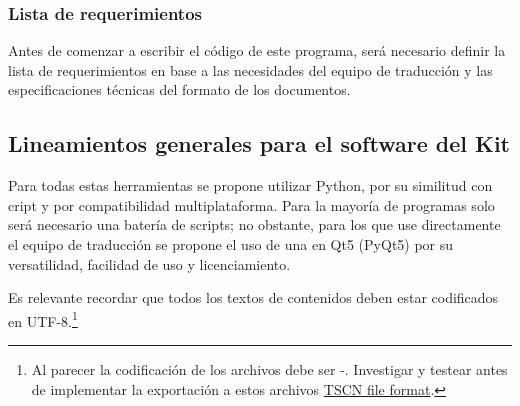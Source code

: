 \subsubsection{Lista de requerimientos}\label{kit:lista-de-requerimientos}
Antes de comenzar a escribir el código de este programa, será necesario definir la lista de requerimientos en base a las necesidades del equipo de traducción y las especificaciones técnicas del formato de los documentos.


\subsection{Lineamientos generales para el software del Kit}\label{kit:lineamientos-software-kit}
Para todas estas herramientas se propone utilizar Python, por su similitud con cript y por compatibilidad multiplataforma. Para la mayoría de programas solo será necesario una batería de scripts; no obstante, para los que use directamente el equipo de traducción se propone el uso de una  en Qt5 (PyQt5) por su versatilidad, facilidad de uso y licenciamiento.

Es relevante recordar que todos los textos de contenidos deben estar codificados en UTF-8.\footnote{Al parecer la codificación de los archivos  debe ser -. Investigar y testear antes de implementar la exportación a estos archivos \href{https://docs.godotengine.org/en/stable/development/file_formats/tscn.html}{TSCN file format}.}